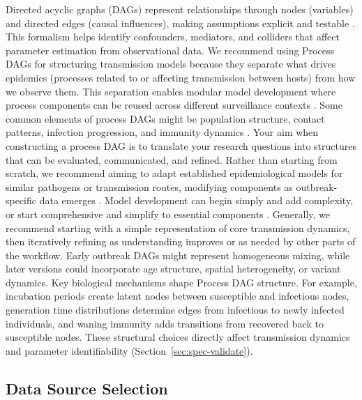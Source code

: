 \documentclass{article}
\begin{document}
Directed acyclic graphs (DAGs) represent relationships through nodes  (variables) and directed edges (causal influences), making assumptions explicit and testable \citep{digitale2022tutorial}. 
This formalism helps identify confounders, mediators, and colliders that affect parameter estimation from observational data.
We recommend using Process DAGs for structuring transmission models because they separate what drives epidemics (processes related to or affecting transmission between hosts) from how we observe them.  
This separation enables modular model development where process components can be reused across different surveillance contexts \citep{nicholson2022interoperability}.
Some common elements of process DAGs might be population structure, contact patterns, infection progression, and immunity dynamics \citep{deangelis2018analysing}. 
Your aim when constructing a process DAG  is to translate your research questions into structures that can be evaluated, communicated, and refined.
Rather than starting from scratch, we recommend aiming to adapt established epidemiological models for similar pathogens or transmission routes, modifying components as outbreak-specific data emerges \citep{gelman2020bayesian}.
Model development can begin simply and add complexity, or start comprehensive and simplify to essential components \citep{gelman2020bayesian}.
Generally, we recommend starting with a simple representation of core transmission dynamics, then iteratively refining as understanding improves or as needed by other parts of the workflow.
Early outbreak DAGs might represent homogeneous mixing, while later versions could incorporate age structure, spatial heterogeneity, or variant dynamics.
 Key biological mechanisms shape Process DAG structure. 
 For example, incubation periods create latent nodes between susceptible and infectious nodes, generation time distributions determine edges from infectious to newly infected individuals, and waning immunity adds transitions from recovered back to susceptible nodes.
 These structural choices directly affect transmission dynamics and parameter identifiability (Section~\ref{sec:spec-validate}). 

\subsection{Data Source Selection} \label{sec:data-selection}
\end{document}
